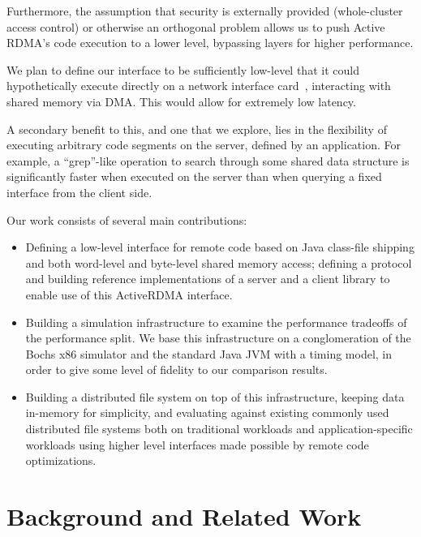 \documentclass[10pt]{article}
\begin{document}
Furthermore, the assumption that security is externally provided
(whole-cluster access control) or otherwise an orthogonal problem
allows us to push Active RDMA's code execution to a lower level,
bypassing layers for higher performance. 

We plan to define our interface to be sufficiently low-level that
it could hypothetically execute directly on a network interface
card~\cite{nic-basedreduction}, interacting with shared memory via DMA.
This would allow for extremely low latency.

A secondary benefit to this, and one that we explore, lies in the
flexibility of executing arbitrary code segments on the server,
defined by an application. For example, a ``grep''-like operation to
search through some shared data structure is significantly faster when
executed on the server than when querying a fixed interface from the
client side.

Our work consists of several main contributions:

\begin{itemize} \itemsep -2pt

\item Defining a low-level interface for remote code based on Java
  class-file shipping and both word-level and byte-level shared memory access; defining a
  protocol and building reference implementations of a server and a
  client library to enable use of this ActiveRDMA interface.

\item Building a simulation infrastructure to examine the performance
  tradeoffs of the performance split. We base this infrastructure on a
  conglomeration of the Bochs x86 simulator and the standard Java
  JVM with a timing model, in order to give some level of fidelity to
  our comparison results.

\item Building a distributed file system on top of this infrastructure,
  keeping data in-memory for simplicity, and evaluating against
  existing commonly used distributed file systems both on traditional
  workloads and application-specific workloads using higher level
  interfaces made possible by remote code optimizations.

\end{itemize}

\section{Background and Related Work}
\end{document}
